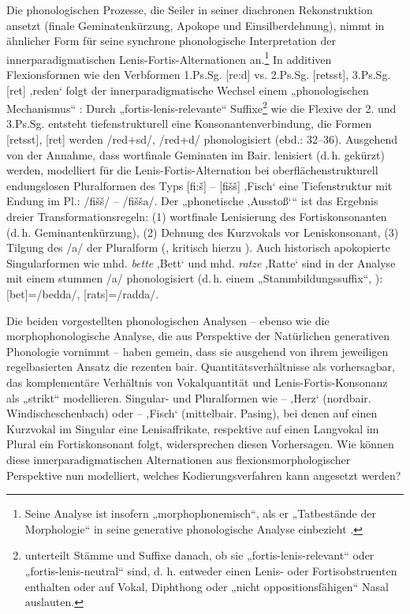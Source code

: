 Die phonologischen Prozesse, die Seiler in seiner diachronen Rekonstruktion ansetzt (finale Geminatenkürzung, Apokope und Einsilberdehnung), nimmt \citet{Hinderling1980} in ähnlicher Form für seine synchrone phonologische Interpretation der innerparadigmatischen Lenis-Fortis-Alternationen an.\footnote{Seine Analyse ist insofern „morphophonemisch“, als er „Tatbestände der Morphologie“ in seine generative phonologische Analyse einbezieht \citep[28--29]{Hinderling1980}.} In additiven Flexionsformen wie den Verbformen 1.Ps.Sg. [re:d] vs. 2.Ps.Sg. [retsst], 3.Ps.Sg. [ret] ‚reden‘ folgt der innerparadigmatische Wechsel einem „phonologischen Mechanismus“ \citep[30]{Hinderling1980}: Durch „fortis-lenis-relevante“ Suffixe\footnote{\citet[31]{Hinderling1980} unterteilt Stämme und Suffixe danach, ob sie „fortis-lenis-relevant“ oder „fortis-lenis-neutral“ sind, d. h. entweder einen Lenis- oder Fortisobstruenten enthalten oder auf Vokal, Diphthong oder „nicht oppositionsfähigen“ Nasal auslauten.} wie die Flexive der 2. und 3.Ps.Sg. entsteht tiefenstrukturell eine Konsonantenverbindung, die Formen [retsst], [ret] werden /red+sd/, /red+d/ phonologisiert (ebd.: 32--36). Ausgehend von der Annahme, dass wortfinale Geminaten im Bair. lenisiert (d.\,h. gekürzt) werden, modelliert \citet[39]{Hinderling1980} für die Lenis-Fortis-Alternation bei oberflächenstrukturell endungslosen Pluralformen des Typs [fi:š] -- [fišš] ‚Fisch‘ eine Tiefenstruktur mit Endung im Pl.: /fišš/ -- /fišša/. Der „phonetische ‚Ausstoß‘“ \citep[39]{Hinderling1980} ist das Ergebnis dreier Transformationsregeln: (1) wortfinale Lenisierung des Fortiskonsonanten (d.\,h. Geminantenkürzung), (2) Dehnung des Kurzvokals vor Leniskonsonant, (3) Tilgung des /a/ der Pluralform (\citealt[39]{Hinderling1980}, kritisch hierzu \citealt[17]{Scheutz1984}). Auch historisch apokopierte Singularformen wie mhd. \textit{bette} ‚Bett‘ und mhd. \textit{ratze} ‚Ratte‘ sind in der Analyse  mit einem stummen /a/ phonologisiert (d.\,h. einem „Stammbildungssuffix“, \citealt[76]{Harnisch1995}): [bet]=/bedda/, [rats]=/radda/.

Die beiden vorgestellten phonologischen Analysen -- ebenso wie die morphophonologische Analyse, die \citet{Harnisch1995, Harnisch2016} aus Perspektive der Natürlichen generativen Phonologie vornimmt -- haben gemein, dass sie ausgehend von ihrem jeweiligen regelbasierten Ansatz die rezenten bair. Quantitätsverhältnisse als vorhersagbar, das komplementäre Verhältnis von Vokalquantität und Lenis-Fortis-Konsonanz als „strikt“ \citep[70]{Harnisch1995} modellieren. Singular- und Pluralformen wie  --  ‚Herz‘ (nordbair. Windischeschenbach) oder  --  ‚Fisch‘ (mittelbair. Pasing), bei denen auf einen Kurzvokal im Singular eine Lenisaffrikate, respektive auf einen Langvokal im Plural ein Fortiskonsonant folgt, widersprechen diesen Vorhersagen. Wie können diese innerparadigmatischen Alternationen aus flexionsmorphologischer Perspektive nun modelliert, welches Kodierungsverfahren kann angesetzt werden?

